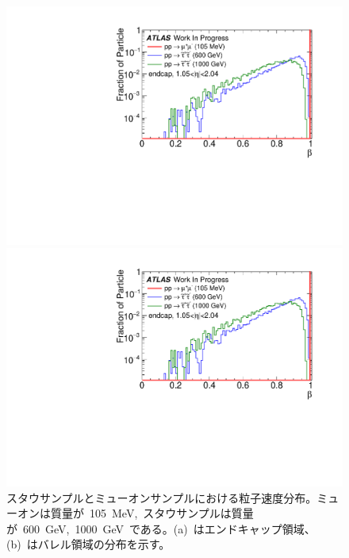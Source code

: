 \begin{figure}[tbp]
    \begin{minipage}{0.49\hsize}
    \centering   
    \includegraphics[width=\textwidth,page=1]{img/plot/beta.pdf}
    \subcaption{}
    \end{minipage}
    \begin{minipage}{0.49\hsize}
    \centering   
    \includegraphics[width=\textwidth,page=5]{img/plot/beta.pdf}
    \subcaption{}
    \end{minipage}
    \caption[スタウサンプルとミューオンサンプルにおける粒子速度分布]{スタウサンプルとミューオンサンプルにおける粒子速度分布。ミューオンは質量が~105~MeV,~スタウサンプルは質量が~600~GeV,~1000~GeV~である。(a)~はエンドキャップ領域、(b)~はバレル領域の分布を示す。}\label{fig:staud2}
\end{figure}

